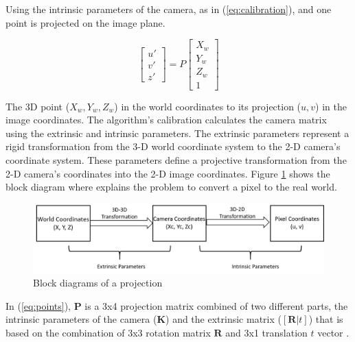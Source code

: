 Using the intrinsic parameters of the camera, as in (\ref{eq:calibration}), and one point is projected on the image plane. 


\begin{equation}
    \label{eq:calibration}
    \begin{bmatrix}
        u'
        \\v' 
        \\ z' 
        
        \end{bmatrix} = P \begin{bmatrix}
        X_w\\
        Y_w 
        \\ Z_w
        \\ 1
        
        \end{bmatrix}
\end{equation}

The 3D point ($X_w, Y_w, Z_w$) in the world coordinates to its projection ($u, v$) in the image coordinates. The algorithm's calibration calculates the camera matrix using the extrinsic and intrinsic parameters. The extrinsic parameters represent a rigid transformation from the 3-D world coordinate system to the 2-D camera’s coordinate system. These parameters define a projective transformation from the 2-D camera’s coordinates into the 2-D image coordinates. Figure \ref{fig:block_extrinsinc} shows the block diagram where explains the problem to convert a pixel to the real world. 


\begin{figure}[H]
\centering
\includegraphics[scale=0.8]{imagens/block_parameters.png}
\caption{Block diagrams of a projection}
\label{fig:block_extrinsinc}
\end{figure}





In (\ref{eq:points}), $\mathbf{P}$ is a 3x4 projection matrix combined of two different parts, the intrinsic parameters of the camera ($\mathbf{K}$) and the extrinsic matrix ($[\mathbf{R}|t]$) that is based on the combination of 3x3 rotation matrix $\mathbf{R}$ and 3x1 translation $t$ vector \cite{kaehler2016learning}. 

